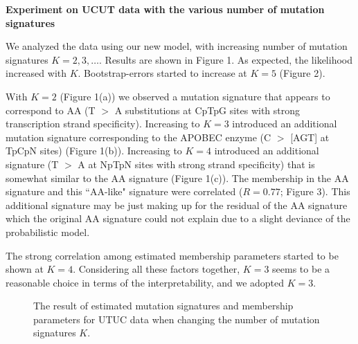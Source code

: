 \documentclass{article}
\begin{document}

\vspace*{1.0cm}
{\LARGE \bf Experiment on UCUT data with the various number of mutation signatures}
\vspace*{0.25cm}


We analyzed the data using our new model, with increasing number of mutation signatures $K=2,3,\dots$. 
Results are shown in Figure 1.
As expected, the likelihood increased with $K$. Bootstrap-errors started to increase at $K = 5$ (Figure 2).

With $K = 2$ (Figure 1(a)) we observed a mutation signature that appears to correspond to AA  (T $>$ A substitutions at CpTpG sites with strong transcription strand specificity).
Increasing to  $K=3$ introduced an additional mutation signature corresponding to the APOBEC enzyme (C $>$ [AGT] at TpCpN sites) (Figure 1(b)).
Increasing to $K = 4$ introduced an additional signature (T $>$ A at NpTpN sites with strong strand specificity) 
that is somewhat similar to the AA signature 
(Figure 1(c)). 
The membership in the AA signature and this ``AA-like" signature were correlated ($R = 0.77$; Figure 3). 
This additional signature may be just making up for the residual of the AA signature 
which the original AA signature could not explain due to a slight deviance of the probabilistic model.

The strong correlation among estimated membership parameters started to be shown at $K = 4$.
Considering all these factors together, $K = 3$ seems to be a reasonable choice in terms of the interpretability,
and we adopted $K = 3$.






\begin{figure}


  
  
  


  
\caption{The result of estimated mutation signatures and membership parameters for UTUC data 
when changing the number of mutation signatures $K$.}
\label{UTUC_multiK}
\end{figure}
\end{document}
